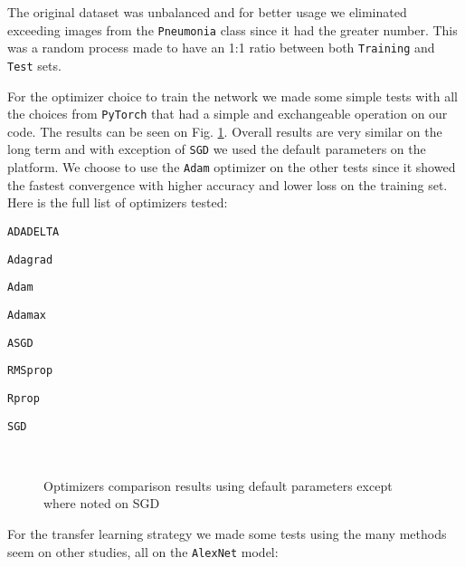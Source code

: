 \documentclass[twocolumn]{article}
\newcommand{\tamfig}{0.9}
\newcommand{\mycite}{\cite}
\begin{document}
The original dataset was unbalanced and for better usage we eliminated exceeding images from the \texttt{Pneumonia} class since it had the greater number. This was a random process made to have an 1:1 ratio between both \texttt{Training} and \texttt{Test} sets.

For the optimizer choice to train the network we made some simple tests with all the choices from \texttt{PyTorch} that had a simple and exchangeable operation on our code. The results can be seen on Fig. \ref{grafico_opt}. Overall results are very similar on the long term and with exception of \texttt{SGD} we used the default parameters on the platform. We choose to use the \texttt{Adam} optimizer on the other tests since it showed the fastest convergence with higher accuracy and lower loss on the training set. Here is the full list of optimizers tested:
\begin{enumerate*}[noitemsep,nolistsep,label={\alph*)}]
\item \texttt{ADADELTA} \mycite{adadelta}
\item \texttt{Adagrad} \mycite{adagrad}
\item \texttt{Adam} \mycite{adam}
\item \texttt{Adamax}
\item \texttt{ASGD} \mycite{asgd}
\item \texttt{RMSprop} \mycite{rmsprop}
\item \texttt{Rprop}
\item \texttt{SGD} \mycite{sgd}
\end{enumerate*}

\begin{figure}[h]
\\
\caption{Optimizers comparison results using default parameters except where noted on SGD}
\label{grafico_opt}
\end{figure}


For the transfer learning strategy we made some tests using the many methods seem on other studies, all on the \texttt{AlexNet} model:
\end{document}

